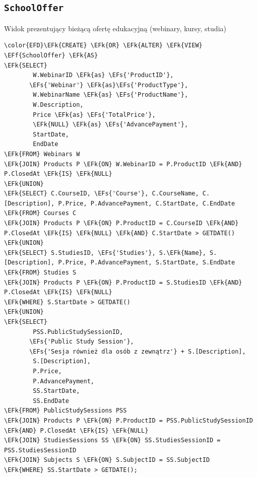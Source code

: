 \documentclass[11pt]{article}
\newcommand{\EFs}[1]{\textcolor{EFs}{#1}} %
\newcommand{\EFk}[1]{\textcolor{EFk}{\textbf{#1}}} %
\newcommand{\EFf}[1]{\textcolor{EFf}{#1}} %
\begin{document}
\subsection{\texttt{SchoolOffer}}
\label{sec:orgba1a4fc}
Widok prezentujący bieżącą ofertę edukacyjną (webinary, kursy, studia)
\begin{Code}
\begin{Verbatim}
\color{EFD}\EFk{CREATE} \EFk{OR} \EFk{ALTER} \EFk{VIEW} \EFf{SchoolOffer} \EFk{AS}
\EFk{SELECT} 
        W.WebinarID \EFk{as} \EFs{'ProductID'},
       \EFs{'Webinar'} \EFk{as}\EFs{'ProductType'},
        W.WebinarName \EFk{as} \EFs{'ProductName'},
        W.Description,
        Price \EFk{as} \EFs{'TotalPrice'},
        \EFk{NULL} \EFk{as} \EFs{'AdvancePayment'},
        StartDate,
        EndDate
\EFk{FROM} Webinars W 
\EFk{JOIN} Products P \EFk{ON} W.WebinarID = P.ProductID \EFk{AND} P.ClosedAt \EFk{IS} \EFk{NULL}
\EFk{UNION}
\EFk{SELECT} C.CourseID, \EFs{'Course'}, C.CourseName, C.[Description], P.Price, P.AdvancePayment, C.StartDate, C.EndDate
\EFk{FROM} Courses C 
\EFk{JOIN} Products P \EFk{ON} P.ProductID = C.CourseID \EFk{AND} P.ClosedAt \EFk{IS} \EFk{NULL} \EFk{AND} C.StartDate > GETDATE()
\EFk{UNION}
\EFk{SELECT} S.StudiesID, \EFs{'Studies'}, S.\EFk{Name}, S.[Description], P.Price, P.AdvancePayment, S.StartDate, S.EndDate
\EFk{FROM} Studies S
\EFk{JOIN} Products P \EFk{ON} P.ProductID = S.StudiesID \EFk{AND} P.ClosedAt \EFk{IS} \EFk{NULL}
\EFk{WHERE} S.StartDate > GETDATE()
\EFk{UNION}
\EFk{SELECT} 
        PSS.PublicStudySessionID,
       \EFs{'Public Study Session'},
       \EFs{'Sesja również dla osób z zewnątrz'} + S.[Description],
        S.[Description],
        P.Price, 
        P.AdvancePayment,
        SS.StartDate,
        SS.EndDate
\EFk{FROM} PublicStudySessions PSS 
\EFk{JOIN} Products P \EFk{ON} P.ProductID = PSS.PublicStudySessionID \EFk{AND} P.ClosedAt \EFk{IS} \EFk{NULL}
\EFk{JOIN} StudiesSessions SS \EFk{ON} SS.StudiesSessionID = PSS.StudiesSessionID
\EFk{JOIN} Subjects S \EFk{ON} S.SubjectID = SS.SubjectID
\EFk{WHERE} SS.StartDate > GETDATE();
\end{Verbatim}
\end{Code}
\end{document}

